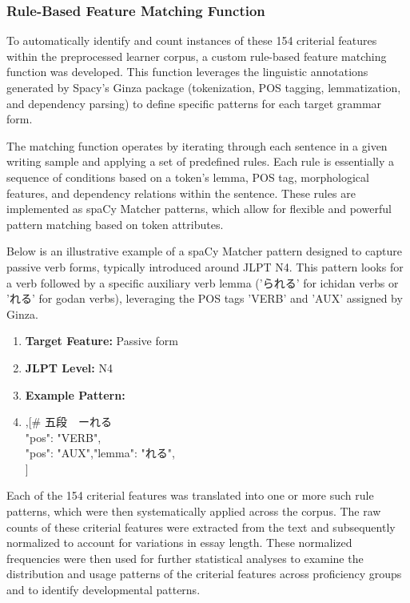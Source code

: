 \subsubsection{Rule-Based Feature Matching Function}

To automatically identify and count instances of these 154 criterial features within the preprocessed learner
corpus, a custom rule-based feature matching function was developed. This function leverages the linguistic
annotations generated by Spacy's Ginza package (tokenization, POS tagging, lemmatization, and dependency parsing) to
define specific patterns for each target grammar form.

The matching function operates by iterating through each sentence in a given writing sample and applying a set of
predefined rules. Each rule is essentially a sequence of conditions based on a token's lemma, POS tag, morphological
features, and dependency relations within the sentence. These rules are implemented as spaCy Matcher patterns,
which allow for flexible and powerful pattern matching based on token attributes.

Below is an illustrative example of a spaCy Matcher pattern designed to capture passive verb forms, typically
introduced around JLPT N4. This pattern looks for a verb followed by a specific auxiliary verb lemma ('られる' for
ichidan verbs or 'れる' for godan verbs), leveraging the POS tags 'VERB' and 'AUX' assigned by Ginza.

\begin{enumerate}
\item \textbf{Target Feature:} Passive form
\item \textbf{JLPT Level:} N4
\item \textbf{Example Pattern:}
\item \begin{lslisting}
,[\# 五段　ーれる\\
            {"pos": "VERB"},\\
            {"pos": "AUX","lemma": "れる"},\\
        ]\\
\end{lslisting}
\end{enumerate}

Each of the 154 criterial features was translated into one or more such rule patterns, which were then
systematically applied across the corpus. The raw counts of these criterial
features were extracted from the text and subsequently normalized to account for variations in
essay length. These normalized frequencies were then used for further statistical analyses to
examine the
distribution and usage patterns of the criterial features across proficiency groups and to identify developmental
patterns.


